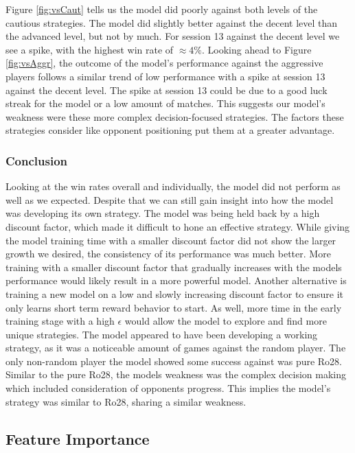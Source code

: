 \documentclass[12pt]{article}
\begin{document}
\begin{thesis}
Figure \ref{fig:vsCaut} tells us the model did poorly against both levels of the cautious strategies. The model did slightly better against the decent level than the advanced level, but not by much. For session 13 against the decent level we see a spike, with the highest win rate of \(\approx4\%\). Looking ahead to Figure \ref{fig:vsAggr}, the outcome of the model's performance against the aggressive players follows a similar trend of low performance with a spike at session 13 against the decent level. The spike at session 13 could be due to a good luck streak for the model or a low amount of matches. This suggests our model's weakness were these more complex decision-focused strategies. The factors these strategies consider like opponent positioning put them at a greater advantage.

\subsubsection{Conclusion}\label{conclusion-1}

Looking at the win rates overall and individually, the model did not perform as well as we expected. Despite that we can still gain insight into how the model was developing its own strategy. The model was being held back by a high discount factor, which made it difficult to hone an effective strategy. While giving the model training time with a smaller discount factor did not show the larger growth we desired, the consistency of its performance was much better. More training with a smaller discount factor that gradually increases with the models performance would likely result in a more powerful model. Another alternative is training a new model on a low and slowly increasing discount factor to ensure it only learns short term reward behavior to start. As well, more time in the early training stage with a high \(\epsilon\) would allow the model to explore and find more unique strategies. The model appeared to have been developing a working strategy, as it was a noticeable amount of games against the random player. The only non-random player the model showed some success against was pure Ro28. Similar to the pure Ro28, the models weakness was the complex decision making which included consideration of opponents progress. This implies the model's strategy was similar to Ro28, sharing a similar weakness.

\subsection{Feature Importance}\label{feature-importance}


\end{thesis}
\end{document}
